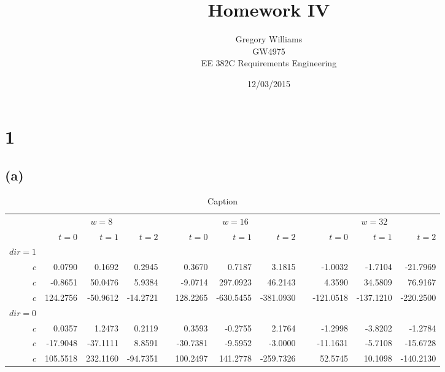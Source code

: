 \documentclass{article}
\title{Homework IV}
\author{Gregory Williams\\GW4975\\EE 382C Requirements Engineering}
\date{12/03/2015}
\newcommand{\ra}[1]{\renewcommand{\arraystretch}{#1}}
\begin{document}
	\maketitle
	
	\section*{1}
	\subsection*{(a)}

	\begin{table*}
	\centering
	\ra{1.3}
	\begin{tabular}{@{}rrrrcrrrcrrr@{}} \toprule
	& \multicolumn{3}{c}{$w = 8$} & \phantom{abc}& \multicolumn{3}{c}{$w = 16$} & \phantom{abc} & \multicolumn{3}{c}{$w = 32$}\\ \cmidrule{2-4} \cmidrule{6-8} \cmidrule{10-12}
	& $t=0$ & $t=1$ & $t=2$ && $t=0$ & $t=1$ & $t=2$ && $t=0$ & $t=1$ & $t=2$\\ \midrule
	$dir=1$\\
	$c$ & 0.0790 & 0.1692 & 0.2945 && 0.3670 & 0.7187 & 3.1815 && -1.0032 & -1.7104 & -21.7969\\
	$c$ & -0.8651& 50.0476& 5.9384&& -9.0714& 297.0923& 46.2143&& 4.3590& 34.5809& 76.9167\\
	$c$ & 124.2756& -50.9612& -14.2721&& 128.2265& -630.5455& -381.0930&& -121.0518& -137.1210& -220.2500\\
	$dir=0$\\
	$c$ & 0.0357& 1.2473& 0.2119&& 0.3593& -0.2755& 2.1764&& -1.2998& -3.8202& -1.2784\\
	$c$ & -17.9048& -37.1111& 8.8591&& -30.7381& -9.5952& -3.0000&& -11.1631& -5.7108& -15.6728\\
	$c$ & 105.5518& 232.1160& -94.7351&& 100.2497& 141.2778& -259.7326&& 52.5745& 10.1098& -140.2130\\ \bottomrule
	\end{tabular}
	\caption{Caption}
	\end{table*}
\end{document}
